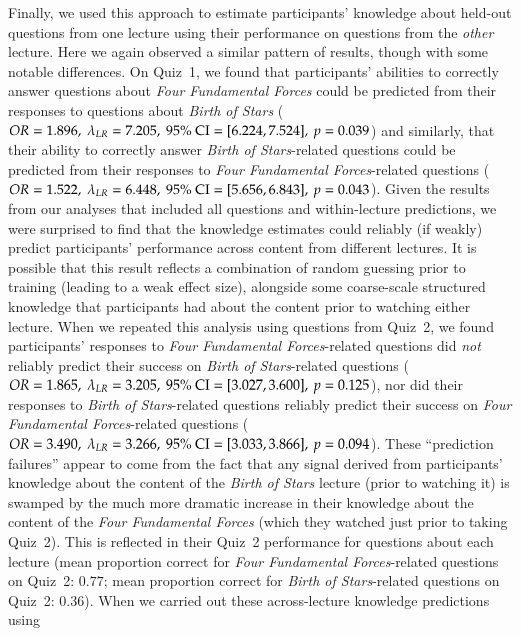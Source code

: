 \documentclass[10pt]{article}
\begin{document}
Finally, we used this approach to estimate participants' knowledge about
held-out questions from one lecture using their performance on questions from
the \textit{other} lecture. Here we again observed a similar pattern of
results, though with some notable differences. On Quiz~1, we found that
participants' abilities to correctly answer questions about \textit{Four
Fundamental Forces} could be predicted from their responses to questions about
\textit{Birth of Stars} ($OR = 1.896,\ \lambda_{LR} = 7.205,\ 95\%\
\textnormal{CI} = [6.224, 7.524],\ p = 0.039$) and similarly, that their
ability to correctly answer \textit{Birth of Stars}-related questions could be
predicted from their responses to \textit{Four Fundamental Forces}-related
questions ($OR = 1.522,\ \lambda_{LR} = 6.448,\ 95\%\ \textnormal{CI} = [5.656,
6.843],\ p = 0.043$). Given the results from our analyses that included all
questions and within-lecture predictions, we were surprised to find that the
knowledge estimates could reliably (if weakly) predict participants'
performance across content from different lectures. It is possible that this
result reflects a combination of random guessing prior to training (leading to
a weak effect size), alongside some coarse-scale structured knowledge that
participants had about the content prior to watching either lecture. When we
repeated this analysis using questions from Quiz~2, we found participants'
responses to \textit{Four Fundamental Forces}-related questions did
\textit{not} reliably predict their success on \textit{Birth of Stars}-related
questions ($OR = 1.865,\ \lambda_{LR} = 3.205,\ 95\%\ \textnormal{CI} = [3.027,
3.600],\ p = 0.125$), nor did their responses to \textit{Birth of
Stars}-related questions reliably predict their success on \textit{Four
Fundamental Forces}-related questions ($OR = 3.490,\ \lambda_{LR} = 3.266,\
95\%\ \textnormal{CI} = [3.033, 3.866],\ p = 0.094$). These ``prediction
failures'' appear to come from the fact that any signal derived from
participants' knowledge about the content of the \textit{Birth of Stars}
lecture (prior to watching it) is swamped by the much more dramatic increase in
their knowledge about the content of the \textit{Four Fundamental Forces}
(which they watched just prior to taking Quiz~2). This is reflected in their
Quiz~2 performance for questions about each lecture (mean proportion correct
for \textit{Four Fundamental Forces}-related questions on Quiz~2: $0.77$; mean
proportion correct for \textit{Birth of Stars}-related questions on Quiz~2:
$0.36$). When we carried out these across-lecture knowledge predictions using
\end{document}
